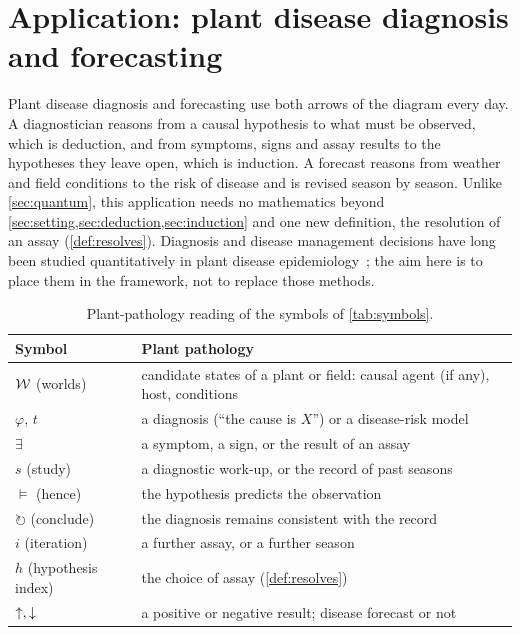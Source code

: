 \section{Application: plant disease diagnosis and forecasting}\label{sec:plant}

Plant disease diagnosis and forecasting use both arrows of the diagram every day. A
diagnostician reasons from a causal hypothesis to what must be observed, which is deduction, and
from symptoms, signs and assay results to the hypotheses they leave open, which is induction. A
forecast reasons from weather and field conditions to the risk of disease and is revised season by
season. Unlike \cref{sec:quantum}, this application needs no mathematics beyond
\cref{sec:setting,sec:deduction,sec:induction} and one new definition, the resolution of an
assay (\cref{def:resolves}). Diagnosis and disease management decisions have long been studied
quantitatively in plant disease epidemiology~\cite{hughes1999,madden2007}; the aim here is to
place them in the framework, not to replace those methods.

\begin{table}[ht]
\centering\small
\begin{tabular}{@{}l>{\raggedright\arraybackslash}p{}@{}}
\toprule
Symbol & Plant pathology \\
\midrule
$\mathcal W$ (worlds) & candidate states of a plant or field: causal agent (if any), host, conditions \\
$\varphi$, $t$ & a diagnosis (``the cause is $X$'') or a disease-risk model \\
$\exists$ & a symptom, a sign, or the result of an assay \\
$s$ (study) & a diagnostic work-up, or the record of past seasons \\
$\models$ (hence) & the hypothesis predicts the observation \\
$\circlearrowright$ (conclude) & the diagnosis remains consistent with the record \\
$i$ (iteration) & a further assay, or a further season \\
$h$ (hypothesis index) & the choice of assay (\cref{def:resolves}) \\
${\uparrow},{\downarrow}$ & a positive or negative result; disease forecast or not \\
\bottomrule
\end{tabular}
\caption{Plant-pathology reading of the symbols of \cref{tab:symbols}.}
\label{tab:plant}
\end{table}

